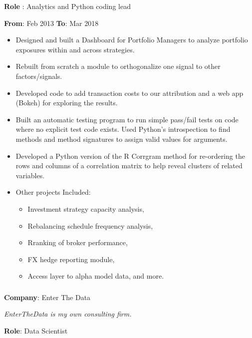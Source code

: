 \documentclass[
]{article}
\providecommand{\tightlist}{%
  \setlength{\itemsep}{0pt}\setlength{\parskip}{0pt}}
\begin{document}
\begin{flushleft}
\textbf{Role} : Analytics and Python coding lead
\end{flushleft}

\textbf{From}: Feb 2013 \hspace{0.5in}  \textbf{To}: Mar 2018\\

\begin{itemize}
\tightlist
\item
  Designed and built a Dashboard for Portfolio Managers to analyze
  portfolio exposures within and across strategies.
\item
  Rebuilt from scratch a module to orthogonalize one signal to other
  factors/signals.
\item
  Developed code to add transaction costs to our attribution and a web
  app (Bokeh) for exploring the results.
\item
  Built an automatic testing program to run simple pass/fail tests on
  code where no explicit test code exists. Used Python's introspection
  to find methods and method signatures to assign valid values for
  arguments.
\item
  Developed a Python version of the R Corrgram method for re-ordering
  the rows and columns of a correlation matrix to help reveal clusters
  of related variables.
\item
  Other projects Included:

  \begin{itemize}
  \tightlist
  \item
    Investment strategy capacity analysis,
  \item
    Rebalancing schedule frequency analysis,
  \item
    Rranking of broker performance,
  \item
    FX hedge reporting module,
  \item
    Access layer to alpha model data, and more.
  \end{itemize}
\end{itemize}

\hypertarget{enterthedata}{\subsubsection{}\label{enterthedata}}
\begin{flushleft}
\textbf{Company}: Enter The Data
\end{flushleft}
{\hspace{.1in} \footnotesize \emph{EnterTheData is my own consulting firm.}}
\begin{flushleft}
\textbf{Role}: Data Scientist
\end{flushleft}
\end{document}

